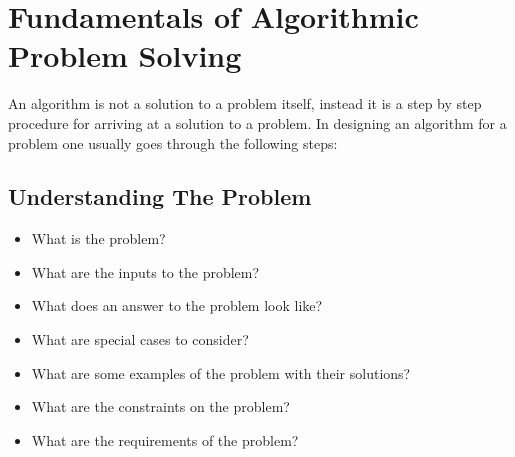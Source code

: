 \documentclass[12pt letter]{report}
\begin{document}


\section{Fundamentals of Algorithmic Problem Solving}

An algorithm is not a solution to a problem itself, instead it is a step by step procedure for arriving at a solution to
a problem. In designing an algorithm for a problem one usually goes through the following steps:

\subsection{Understanding The Problem}

\begin{itemize}
  \item What is the problem?
  \item What are the inputs to the problem?
  \item  What does an answer to the problem look like?
  \item What are special cases to consider?
  \item What are some examples of the problem with their solutions?
  \item What are the constraints on the problem?
  \item What are the requirements of the problem?
\end{itemize}
\end{document}
